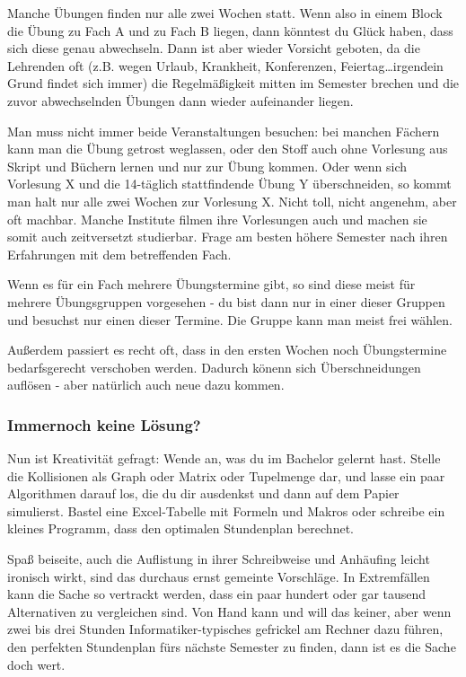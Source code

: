 \begin{multicols}{2}
Manche Übungen finden nur alle zwei Wochen statt. Wenn also in einem Block die Übung zu Fach A und zu Fach B liegen, dann könntest du Glück haben, dass sich diese genau abwechseln. Dann ist aber wieder Vorsicht geboten, da die Lehrenden oft (z.B. wegen Urlaub, Krankheit, Konferenzen, Feiertag\ldots irgendein Grund findet sich immer) die Regelmäßigkeit mitten im Semester brechen und die zuvor abwechselnden Übungen dann wieder aufeinander liegen.

Man muss nicht immer beide Veranstaltungen besuchen: bei manchen Fächern kann man die Übung getrost weglassen, oder den Stoff auch ohne Vorlesung aus Skript und Büchern lernen und nur zur Übung kommen. Oder wenn sich Vorlesung X und die 14-täglich stattfindende Übung Y überschneiden, so kommt man halt nur alle zwei Wochen zur Vorlesung X. Nicht toll, nicht angenehm, aber oft machbar. Manche Institute filmen ihre Vorlesungen auch und machen sie somit auch zeitversetzt studierbar. Frage am besten höhere Semester nach ihren Erfahrungen mit dem betreffenden Fach.

Wenn es für ein Fach mehrere Übungstermine gibt, so sind diese meist für mehrere Übungsgruppen vorgesehen - du bist dann nur in einer dieser Gruppen und besuchst nur einen dieser Termine. Die Gruppe kann man meist frei wählen.

Außerdem passiert es recht oft, dass in den ersten Wochen noch Übungstermine bedarfsgerecht verschoben werden. Dadurch könenn sich Überschneidungen auflösen - aber natürlich auch neue dazu kommen.

\subsubsection{Immernoch keine Lösung?}
Nun ist Kreativität gefragt: Wende an, was du im Bachelor gelernt hast. Stelle die Kollisionen als Graph oder Matrix oder Tupelmenge dar, und lasse ein paar Algorithmen darauf los, die du dir ausdenkst und dann auf dem Papier simulierst. Bastel eine Excel-Tabelle mit Formeln und Makros oder schreibe ein kleines Programm, dass den optimalen Stundenplan berechnet. 

Spaß beiseite, auch die Auflistung in ihrer Schreibweise und Anhäufing leicht ironisch wirkt, sind das durchaus ernst gemeinte Vorschläge. In Extremfällen kann die Sache so vertrackt werden, dass ein paar hundert oder gar tausend Alternativen zu vergleichen sind. Von Hand kann und will das keiner, aber wenn zwei bis drei Stunden Informatiker-typisches gefrickel am Rechner dazu führen, den perfekten Stundenplan fürs nächste Semester zu finden, dann ist es die Sache doch wert.


\end{multicols}
